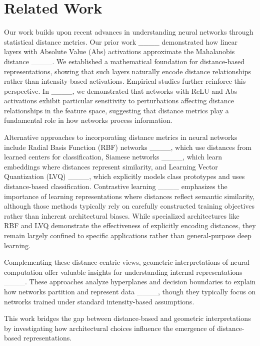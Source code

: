 \section{Related Work}
\label{sec:related_work}

Our work builds upon recent advances in understanding neural networks through statistical distance metrics. Our prior work ____ demonstrated how linear layers with Absolute Value (Abs) activations approximate the Mahalanobis distance ____. We established a mathematical foundation for distance-based representations, showing that such layers naturally encode distance relationships rather than intensity-based activations. Empirical studies further reinforce this perspective. In ____, we demonstrated that networks with ReLU and Abs activations exhibit particular sensitivity to perturbations affecting distance relationships in the feature space, suggesting that distance metrics play a fundamental role in how networks process information.

Alternative approaches to incorporating distance metrics in neural networks include Radial Basis Function (RBF) networks ____, which use distances from learned centers for classification, Siamese networks ____, which learn embeddings where distances represent similarity, and Learning Vector Quantization (LVQ) ____, which explicitly models class prototypes and uses distance-based classification. Contrastive learning ____ emphasizes the importance of learning representations where distances reflect semantic similarity, although those methods typically rely on carefully constructed training objectives rather than inherent architectural biases. While specialized architectures like RBF and LVQ demonstrate the effectiveness of explicitly encoding distances, they remain largely confined to specific applications rather than general-purpose deep learning.

Complementing these distance-centric views, geometric interpretations of neural computation offer valuable insights for understanding internal representations ____. These approaches analyze hyperplanes and decision boundaries to explain how networks partition and represent data ____, though they typically focus on networks trained under standard intensity-based assumptions.

This work bridges the gap between distance-based and geometric interpretations by investigating how architectural choices influence the emergence of distance-based representations.